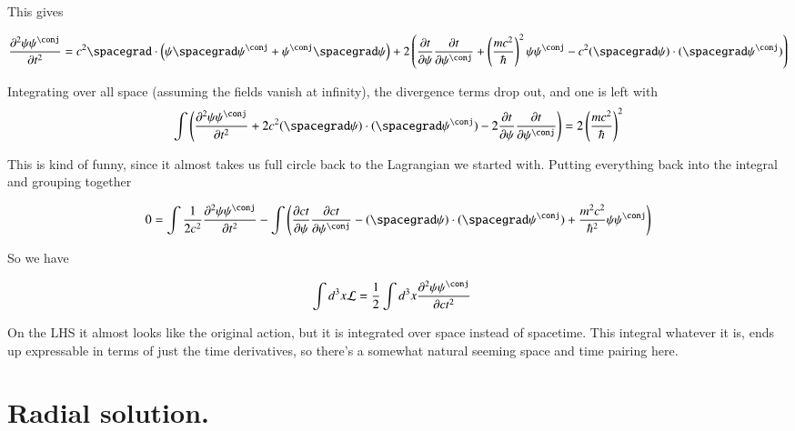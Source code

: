 \documentclass{article}
\newcommand{\PDSq}[2]{\frac{\partial^2 {#2}}{\partial {#1}^2}}
\begin{document}
This gives

\begin{align*}
\PDSq{t}{\psi\psi^\conj}
&=
c^2 \spacegrad \cdot \left( \psi \spacegrad \psi^\conj +\psi^\conj \spacegrad \psi \right)
+ 2 \left(
\PD{t}{\psi}\PD{t}{\psi^\conj} + \left( \frac{m c^2}{\hbar} \right)^2 \psi \psi^\conj
-c^2 (\spacegrad \psi) \cdot (\spacegrad \psi^\conj)
\right)
\\
\end{align*}

Integrating over all space (assuming the fields vanish at infinity), the divergence terms drop out, and one is left with
\begin{align*}
\int \left( \PDSq{t}{\psi\psi^\conj}
+ 2 c^2 (\spacegrad \psi) \cdot (\spacegrad \psi^\conj)
- 2 \PD{t}{\psi}\PD{t}{\psi^\conj}  \right)
&=
2 \left( \frac{m c^2}{\hbar} \right)^2
\\
\end{align*}

This is kind of funny, since it almost takes us full circle back to the Lagrangian we started with.  Putting everything
back into the integral and grouping together

\begin{align*}
0 &=
\int \inv{2 c^2} \PDSq{t}{\psi\psi^\conj}
- \int
\left(
\PD{ct}{\psi}\PD{ct}{\psi^\conj}
- (\spacegrad \psi) \cdot (\spacegrad \psi^\conj)
+ \frac{m^2 c^2}{\hbar^2} \psi \psi^\conj
\right)
\\
\end{align*}

So we have

\begin{align*}
\int d^3 x \LL &= \inv{2} \int d^3 x \PDSq{ct}{\psi\psi^\conj}
\end{align*}

On the LHS it almost looks like the original action, but it is integrated over space instead of spacetime.  This integral
whatever it is, ends up expressable in terms of just the time derivatives, so there's a somewhat natural seeming space and time
pairing here.

\section{ Radial solution. }
\end{document}
